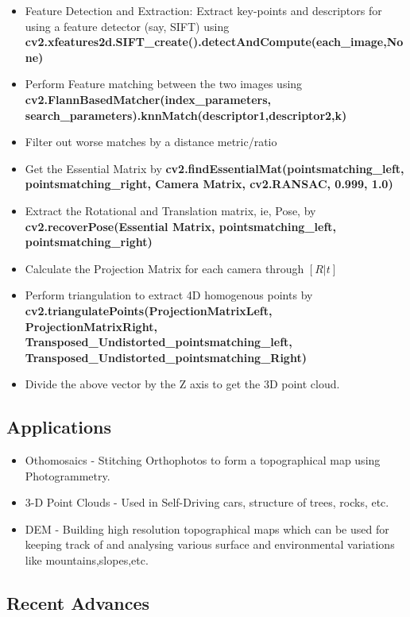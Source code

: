 \documentclass{article}[11pt]
\begin{document}
\begin{itemize}
    \item Feature Detection and Extraction:  Extract key-points and descriptors for using a feature detector (say, SIFT)
    using \textbf{cv2.xfeatures2d.SIFT\_create().detectAndCompute(each\_image,None)}
    \item Perform Feature matching between the two images using \textbf{cv2.FlannBasedMatcher(index\_parameters, search\_parameters).knnMatch(descriptor1,descriptor2,k)}
    \item Filter out worse matches by a distance metric/ratio
    \item Get the Essential Matrix by \textbf{ cv2.findEssentialMat(pointsmatching\_left, pointsmatching\_right, Camera Matrix, cv2.RANSAC, 0.999, 1.0)}
    \item Extract the Rotational and Translation matrix, ie, Pose, by \textbf{cv2.recoverPose(Essential Matrix, pointsmatching\_left, pointsmatching\_right)}
    \item Calculate the Projection Matrix for each camera through $[R|t]$
    \item Perform triangulation to extract 4D homogenous points by \textbf{cv2.triangulatePoints(ProjectionMatrixLeft, ProjectionMatrixRight, Transposed\_Undistorted\_pointsmatching\_left,\\ Transposed\_Undistorted\_pointsmatching\_Right)}
    \item Divide the above vector by the Z axis to get the 3D point cloud.


\end{itemize}


\subsection{Applications}

\begin{itemize}
    \item Othomosaics - Stitching Orthophotos to form a topographical map using Photogrammetry. 
    \item 3-D Point Clouds - Used in Self-Driving cars, structure of trees, rocks, etc.
    \item DEM - Building high resolution topographical maps which can be used for keeping track of and analysing various surface and environmental variations like mountains,slopes,etc.
\end{itemize}

\subsection{Recent Advances}
\end{document}

